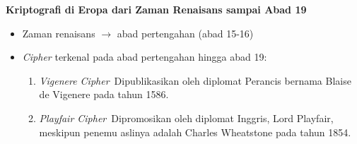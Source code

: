 \documentclass{article}
\begin{document}

\textbf{Kriptografi di Eropa dari Zaman Renaisans sampai Abad 19}

\begin{itemize}
    \item Zaman renaisans $\rightarrow$ abad pertengahan (abad 15-16)
    \item \textit{Cipher} terkenal pada abad pertengahan hingga abad 19:
    \begin{enumerate}
        \item \textit{Vigenere Cipher}\
        Dipublikasikan oleh diplomat Perancis bernama Blaise de Vigenere pada tahun 1586.
        \vspace{5mm}
        \item \textit{Playfair Cipher}\
        Dipromosikan oleh diplomat Inggris, Lord Playfair, meskipun penemu aslinya adalah Charles Wheatstone pada tahun 1854.
    \end{enumerate}
\end{itemize}
\end{document}
